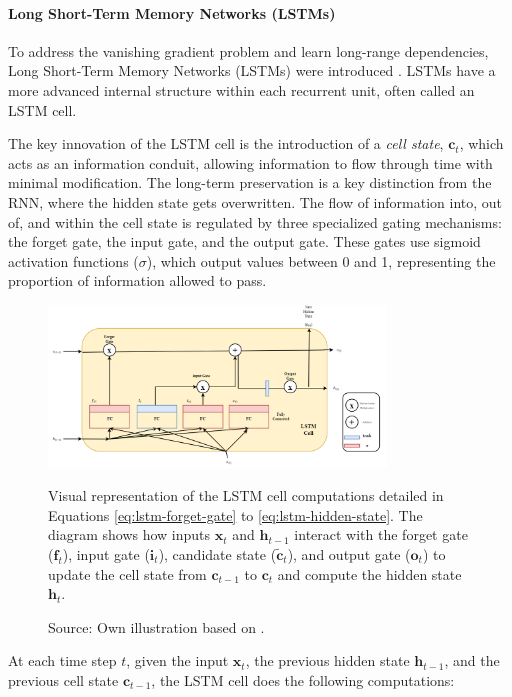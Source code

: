 \paragraph{\textbf{Long Short-Term Memory Networks (LSTMs)}}
\label{sec:lstm}

To address the vanishing gradient problem and learn long-range dependencies, Long Short-Term Memory Networks (LSTMs) were introduced \autocite{hochreiter1997long}. LSTMs have a more advanced internal structure within each recurrent unit, often called an LSTM cell.

The key innovation of the LSTM cell is the introduction of a \textit{cell state}, \( \bm{c}_t \), which acts as an information conduit, allowing information to flow through time with minimal modification. The long-term preservation is a key distinction from the RNN, where the hidden state gets overwritten. The flow of information into, out of, and within the cell state is regulated by three specialized gating mechanisms: the forget gate, the input gate, and the output gate. These gates use sigmoid activation functions (\(\sigma\)), which output values between 0 and 1, representing the proportion of information allowed to pass.

\begin{figure}[htbp]
  \centering
  \includegraphics[width=0.8\textwidth]{figures/lstmcell.png}
  \caption[LSTM Cell]{Visual representation of the LSTM cell computations detailed in Equations \ref{eq:lstm-forget-gate} to \ref{eq:lstm-hidden-state}. The diagram shows how inputs $\bm{x}_t$ and $\bm{h}_{t-1}$ interact with the forget gate ($\bm{f}_t$), input gate ($\bm{i}_t$), candidate state ($\bm{\tilde{c}}_t$), and output gate ($\bm{o}_t$) to update the cell state from $\bm{c}_{t-1}$ to $\bm{c}_t$ and compute the hidden state $\bm{h}_t$.}
  \caption*{Source: Own illustration based on \autocite{geron2022hands}.}
  \label{fig:lstm_cell}
\end{figure}
At each time step \( t \), given the input \( \bm{x}_t \), the previous hidden state \( \bm{h}_{t-1} \), and the previous cell state \( \bm{c}_{t-1} \), the LSTM cell does the following computations:

